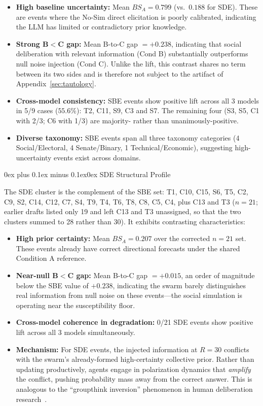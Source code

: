 \documentclass[11pt,journal,onecolumn]{IEEEtran}
\makeatletter
\renewcommand\subsubsection{\@startsection{subsubsection}{3}{\parindent}%
  {0ex plus 0.1ex minus 0.1ex}{0ex}%
  {\normalfont\normalsize\bfseries\itshape}}
\makeatother
\begin{document}
\begin{itemize}
    \item \textbf{High baseline uncertainty:} Mean $BS_A = 0.799$ (vs.~$0.188$ for SDE). These are events where the No-Sim direct elicitation is poorly calibrated, indicating the LLM has limited or contradictory prior knowledge.
    \item \textbf{Strong B$<$C gap:} Mean B-to-C gap $= +0.238$, indicating that social deliberation with relevant information (Cond B) substantially outperforms null noise injection (Cond C). Unlike the lift, this contrast shares no term between its two sides and is therefore not subject to the artifact of Appendix~\ref{sec:tautology}.
    \item \textbf{Cross-model consistency:} SBE events show positive lift across all 3 models in 5/9 cases ($55.6\%$): T2, C11, S9, C3 and S7. The remaining four (S3, S5, C1 with 2/3; C6 with 1/3) are majority- rather than unanimously-positive.
    \item \textbf{Diverse taxonomy:} SBE events span all three taxonomy categories (4 Social/Electoral, 4 Senate/Binary, 1 Technical/Economic), suggesting high-uncertainty events exist across domains.
\end{itemize}

\subsubsection{SDE Structural Profile}

The SDE cluster is the complement of the SBE set: T1, C10, C15, S6, T5, C2, C9, S2, C14, C12, C7, S4, T9, T4, T6, T8, C8, C5, C4, plus C13 and T3 ($n=21$; earlier drafts listed only 19 and left C13 and T3 unassigned, so that the two clusters summed to 28 rather than 30). It exhibits contrasting characteristics:

\begin{itemize}
    \item \textbf{High prior certainty:} Mean $BS_A = 0.207$ over the corrected $n=21$ set. These events already have correct directional forecasts under the shared Condition A reference.
    \item \textbf{Near-null B$<$C gap:} Mean B-to-C gap $= +0.015$, an order of magnitude below the SBE value of $+0.238$, indicating the swarm barely distinguishes real information from null noise on these events---the social simulation is operating near the susceptibility floor.
    \item \textbf{Cross-model coherence in degradation:} 0/21 SDE events show positive lift across all 3 models simultaneously.
    \item \textbf{Mechanism:} For SDE events, the injected information at $R=30$ conflicts with the swarm's already-formed high-certainty collective prior. Rather than updating productively, agents engage in polarization dynamics that \emph{amplify} the conflict, pushing probability mass away from the correct answer. This is analogous to the ``groupthink inversion'' phenomenon in human deliberation research~\cite{surowiecki2005}.
\end{itemize}
\end{document}
